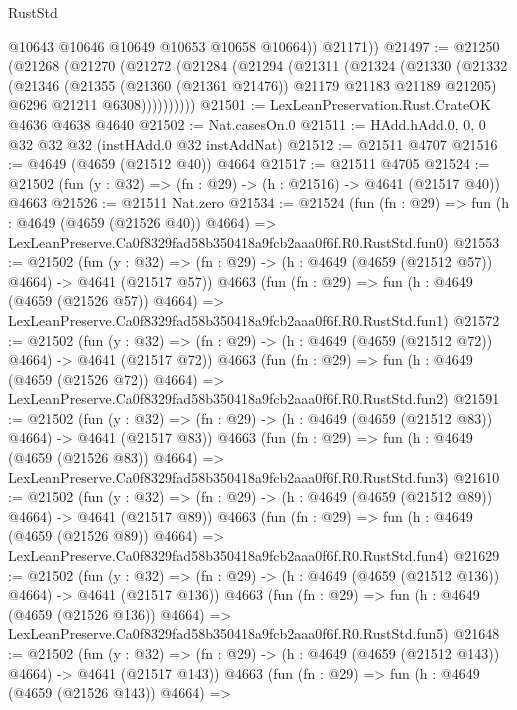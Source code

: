 \begin{lexlean}{RustStd}
\begin{coremodule}
            @10643
            @10646
            @10649
            @10653
            @10658
            @10664))
        @21171))
@21497 := @21250
    (@21268
      (@21270
        (@21272
          (@21284
            (@21294
              (@21311
                (@21324
                  (@21330
                    (@21332
                      (@21346
                        (@21355 (@21360 (@21361 @21476)) @21179 @21183 @21189 @21205)
                        @6296
                        @21211
                        @6308))))))))))
@21501 := LexLeanPreservation.Rust.CrateOK @4636 @4638 @4640
@21502 := Nat.casesOn.{0}
@21511 := HAdd.hAdd.{0, 0, 0} @32 @32 @32 (instHAdd.{0} @32 instAddNat)
@21512 := @21511 @4707
@21516 := @4649 (@4659 (@21512 @40)) @4664
@21517 := @21511 @4705
@21524 := @21502 (fun (y : @32) => (fn : @29) -> (h : @21516) -> @4641 (@21517 @40)) @4663
@21526 := @21511 Nat.zero
@21534 := @21524
    (fun (fn : @29) =>
    fun (h : @4649 (@4659 (@21526 @40)) @4664) =>
    LexLeanPreserve.Ca0f8329fad58b350418a9fcb2aaa0f6f.R0.RustStd.fun0)
@21553 := @21502
    (fun (y : @32) => (fn : @29) -> (h : @4649 (@4659 (@21512 @57)) @4664) -> @4641 (@21517 @57))
    @4663
    (fun (fn : @29) =>
    fun (h : @4649 (@4659 (@21526 @57)) @4664) =>
    LexLeanPreserve.Ca0f8329fad58b350418a9fcb2aaa0f6f.R0.RustStd.fun1)
@21572 := @21502
    (fun (y : @32) => (fn : @29) -> (h : @4649 (@4659 (@21512 @72)) @4664) -> @4641 (@21517 @72))
    @4663
    (fun (fn : @29) =>
    fun (h : @4649 (@4659 (@21526 @72)) @4664) =>
    LexLeanPreserve.Ca0f8329fad58b350418a9fcb2aaa0f6f.R0.RustStd.fun2)
@21591 := @21502
    (fun (y : @32) => (fn : @29) -> (h : @4649 (@4659 (@21512 @83)) @4664) -> @4641 (@21517 @83))
    @4663
    (fun (fn : @29) =>
    fun (h : @4649 (@4659 (@21526 @83)) @4664) =>
    LexLeanPreserve.Ca0f8329fad58b350418a9fcb2aaa0f6f.R0.RustStd.fun3)
@21610 := @21502
    (fun (y : @32) => (fn : @29) -> (h : @4649 (@4659 (@21512 @89)) @4664) -> @4641 (@21517 @89))
    @4663
    (fun (fn : @29) =>
    fun (h : @4649 (@4659 (@21526 @89)) @4664) =>
    LexLeanPreserve.Ca0f8329fad58b350418a9fcb2aaa0f6f.R0.RustStd.fun4)
@21629 := @21502
    (fun (y : @32) => (fn : @29) -> (h : @4649 (@4659 (@21512 @136)) @4664) -> @4641 (@21517 @136))
    @4663
    (fun (fn : @29) =>
    fun (h : @4649 (@4659 (@21526 @136)) @4664) =>
    LexLeanPreserve.Ca0f8329fad58b350418a9fcb2aaa0f6f.R0.RustStd.fun5)
@21648 := @21502
    (fun (y : @32) => (fn : @29) -> (h : @4649 (@4659 (@21512 @143)) @4664) -> @4641 (@21517 @143))
    @4663
    (fun (fn : @29) =>
    fun (h : @4649 (@4659 (@21526 @143)) @4664) =>

\end{coremodule}
\end{lexlean}
